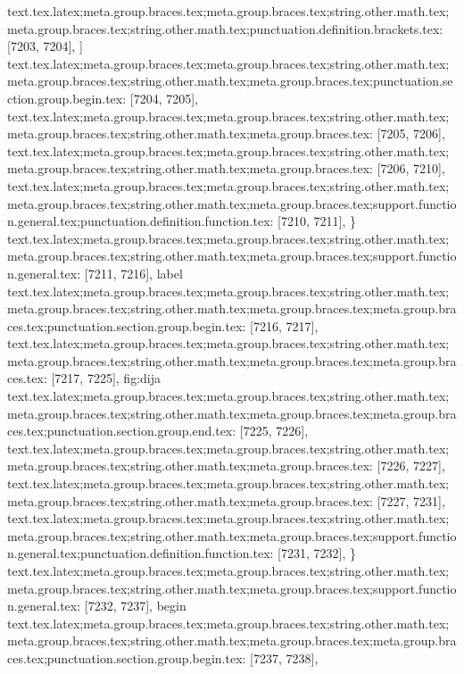{{{{{{{{{{{{{{{{{{{{{{{{{{{{{{{{{{{{{{{{{{{{{{{{{{{{{{{{{{{{{{{{{{{{{{{{{{{{{{{{{{{{{{{{{{{{{{{{{{{{{{{{{{{{{{{{{{{{{{{{{{{{{{{{{{{{{{{{{{{{{{{{{{{{{{{{{{{{{{{{{{{{{{{{{{{{{{{{{{{{{{{{{{{{{text.tex.latex;meta.group.braces.tex;meta.group.braces.tex;string.other.math.tex;meta.group.braces.tex;string.other.math.tex;punctuation.definition.brackets.tex: [7203, 7204], {]}
text.tex.latex;meta.group.braces.tex;meta.group.braces.tex;string.other.math.tex;meta.group.braces.tex;string.other.math.tex;meta.group.braces.tex;punctuation.section.group.begin.tex: [7204, 7205], {{}
text.tex.latex;meta.group.braces.tex;meta.group.braces.tex;string.other.math.tex;meta.group.braces.tex;string.other.math.tex;meta.group.braces.tex: [7205, 7206], {
}
text.tex.latex;meta.group.braces.tex;meta.group.braces.tex;string.other.math.tex;meta.group.braces.tex;string.other.math.tex;meta.group.braces.tex: [7206, 7210], {    }
text.tex.latex;meta.group.braces.tex;meta.group.braces.tex;string.other.math.tex;meta.group.braces.tex;string.other.math.tex;meta.group.braces.tex;support.function.general.tex;punctuation.definition.function.tex: [7210, 7211], {\}
text.tex.latex;meta.group.braces.tex;meta.group.braces.tex;string.other.math.tex;meta.group.braces.tex;string.other.math.tex;meta.group.braces.tex;support.function.general.tex: [7211, 7216], {label}
text.tex.latex;meta.group.braces.tex;meta.group.braces.tex;string.other.math.tex;meta.group.braces.tex;string.other.math.tex;meta.group.braces.tex;meta.group.braces.tex;punctuation.section.group.begin.tex: [7216, 7217], {{}
text.tex.latex;meta.group.braces.tex;meta.group.braces.tex;string.other.math.tex;meta.group.braces.tex;string.other.math.tex;meta.group.braces.tex;meta.group.braces.tex: [7217, 7225], {fig:dija}
text.tex.latex;meta.group.braces.tex;meta.group.braces.tex;string.other.math.tex;meta.group.braces.tex;string.other.math.tex;meta.group.braces.tex;meta.group.braces.tex;punctuation.section.group.end.tex: [7225, 7226], {}}
text.tex.latex;meta.group.braces.tex;meta.group.braces.tex;string.other.math.tex;meta.group.braces.tex;string.other.math.tex;meta.group.braces.tex: [7226, 7227], {
}
text.tex.latex;meta.group.braces.tex;meta.group.braces.tex;string.other.math.tex;meta.group.braces.tex;string.other.math.tex;meta.group.braces.tex: [7227, 7231], {    }
text.tex.latex;meta.group.braces.tex;meta.group.braces.tex;string.other.math.tex;meta.group.braces.tex;string.other.math.tex;meta.group.braces.tex;support.function.general.tex;punctuation.definition.function.tex: [7231, 7232], {\}
text.tex.latex;meta.group.braces.tex;meta.group.braces.tex;string.other.math.tex;meta.group.braces.tex;string.other.math.tex;meta.group.braces.tex;support.function.general.tex: [7232, 7237], {begin}
text.tex.latex;meta.group.braces.tex;meta.group.braces.tex;string.other.math.tex;meta.group.braces.tex;string.other.math.tex;meta.group.braces.tex;meta.group.braces.tex;punctuation.section.group.begin.tex: [7237, 7238], {{}
}}}}}}}}}}}}}}}}}}}}}}}}}}}}}}}}}}}}}}}}}}}}}}}}}}}}}}}}}}}}}}}}}}}}}}}}}}}}}}}}}}}}}}}}}}}}}}}}}}}}}}}}}}}}}}}}}}}}}}}}}}}}}}}}}}}}}}}}}}}}}}}}}}}}}}}}}}}}}}}}}}}}}}}}}}}}}}}}}}}}}}}}}}}}}}}}}
